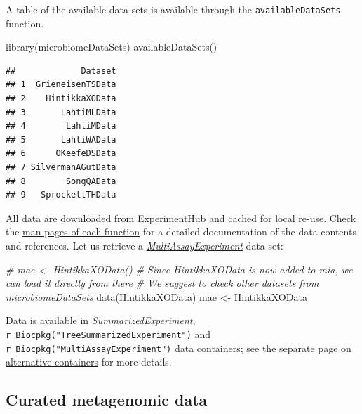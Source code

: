 \documentclass[
]{book}
\newenvironment{Shaded}{\begin{snugshade}}{\end{snugshade}}
\newcommand{\CommentTok}[1]{\textcolor[rgb]{0.56,0.35,0.01}{\textit{#1}}}
\newcommand{\FunctionTok}[1]{\textcolor[rgb]{0.00,0.00,0.00}{#1}}
\newcommand{\NormalTok}[1]{#1}
\newcommand{\OtherTok}[1]{\textcolor[rgb]{0.56,0.35,0.01}{#1}}
\begin{document}
A table of the available data sets is available through the
\texttt{availableDataSets} function.

\begin{Shaded}
\begin{Highlighting}[]
\FunctionTok{library}\NormalTok{(microbiomeDataSets)}
\FunctionTok{availableDataSets}\NormalTok{()}
\end{Highlighting}
\end{Shaded}

\begin{verbatim}
##             Dataset
## 1  GrieneisenTSData
## 2    HintikkaXOData
## 3       LahtiMLData
## 4        LahtiMData
## 5       LahtiWAData
## 6      OKeefeDSData
## 7 SilvermanAGutData
## 8        SongQAData
## 9   SprockettTHData
\end{verbatim}

All data are downloaded from ExperimentHub and cached for local
re-use. Check the \href{https://microbiome.github.io/microbiomeDataSets/reference/index.html}{man pages of each
function}
for a detailed documentation of the data contents and references. Let
us retrieve a \emph{\href{https://bioconductor.org/packages/3.17/MultiAssayExperiment}{MultiAssayExperiment}} data set:

\begin{Shaded}
\begin{Highlighting}[]
\CommentTok{\# mae \textless{}{-} HintikkaXOData()}
\CommentTok{\# Since HintikkaXOData is now added to mia, we can load it directly from there}
\CommentTok{\# We suggest to check other datasets from microbiomeDataSets}
\FunctionTok{data}\NormalTok{(HintikkaXOData)}
\NormalTok{mae }\OtherTok{\textless{}{-}}\NormalTok{ HintikkaXOData}
\end{Highlighting}
\end{Shaded}

Data is available in \emph{\href{https://bioconductor.org/packages/3.17/SummarizedExperiment}{SummarizedExperiment}}, \texttt{r\ Biocpkg("TreeSummarizedExperiment")} and \texttt{r\ Biocpkg("MultiAssayExperiment")} data containers; see the separate
page on \href{https://microbiome.github.io/OMA/multitable.html}{alternative
containers} for more
details.

\hypertarget{curated-metagenomic-data}{%
\subsection{Curated metagenomic data}\label{curated-metagenomic-data}}
\end{document}
